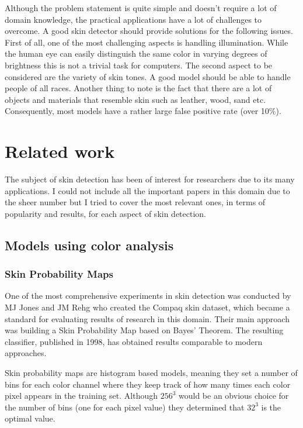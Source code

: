\documentclass[12pt]{report}
\begin{document}
	Although the problem statement is quite simple and doesn't require a lot of domain knowledge, the practical applications have a lot of challenges to overcome. A good skin detector should provide solutions for the following issues\cite{survey_skin_color_modeling}. First of all, one of the most challenging aspects is handling illumination. While the human eye can easily distinguish the same color in varying degrees of brightness this is not a trivial task for computers. The second aspect to be considered are the variety of skin tones. A good model should be able to handle people of all races. Another thing to note is the fact that there are a lot of objects and materials that resemble skin such as leather, wood, sand etc. Consequently, most models have a rather large false positive rate (over 10\%).
	
	\section{Related work}
	The subject of skin detection has been of interest for researchers due to its many applications. I could not include all the important papers in this domain due to the sheer number but I tried to cover the most relevant ones, in terms of popularity and results, for each aspect of skin detection.
	
	\subsection{Models using color analysis}
	
	\subsubsection{Skin Probability Maps}
	One of the most comprehensive experiments in skin detection was conducted by MJ Jones and JM Rehg\cite{compaq} who created the Compaq skin dataset, which became a standard for evaluating results of research in this domain. Their main approach was building a Skin Probability Map based on Bayes' Theorem. The resulting classifier, published in 1998, has obtained results comparable to modern approaches.
	
	Skin probability maps are histogram based models, meaning they set a number of bins for each color channel where they keep track of how many times each color pixel appears in the training set. Although \(256^3\) would be an obvious choice for the number of bins (one for each pixel value) they determined that \(32^3\) is the optimal value.
	
\end{document}
